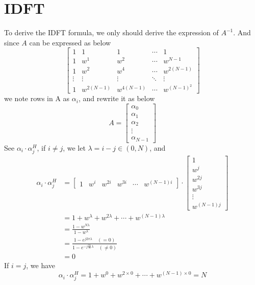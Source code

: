 \documentclass{article}
\begin{document}
\section{IDFT}
To derive the IDFT formula, we only should derive the expression of $A^{-1}$. And since $A$ can be expressed as below
$$
\begin{bmatrix}
 1 & 1 & 1 & \cdots & 1 \\
 1 & w^1 & w^2 & \cdots & w^{N - 1} \\
 1 & w^2 & w^4 & \cdots & w^{2(N - 1)}\\ 
 \vdots & \vdots & \vdots& \ddots & \vdots\\
 1 & w^{2(N - 1)} & w^{4(N - 1)} & \cdots & w^{(N - 1)^2}
 \end{bmatrix}
$$
we note rows in A as $\alpha_i$, and rewrite it as below
$$
A = 
\begin{bmatrix}
\alpha_0 \\ \alpha_1 \\ \alpha_2 \\ \vdots \\ \alpha_{N - 1}
 \end{bmatrix} 
$$
See $\alpha_i \cdot \alpha_j^H$, if $i \neq j$, we let $\lambda = i - j \in (0, N)$, and
\begin{equation}
\begin{aligned}
    \alpha_i \cdot \alpha_j^H &= \begin{bmatrix}
    1 & w^i & w^{2i} & w^{3i} & \cdots & w^{(N - 1)i}
     \end{bmatrix}
     \cdot
     \begin{bmatrix}
    1 \\ w^j \\ w^{2j} \\ w^{3j} \\ \vdots \\ w^{(N - 1)j}
     \end{bmatrix}\\
     &= 1 + w^{\lambda} + w^{2 \lambda} + \cdots + w^{(N - 1) \lambda}\\
     &= \frac{1 - w^{N \lambda}}{1 - w^{\lambda}}\\ 
     &= \frac{1 - e^{j 2\pi\lambda} \quad (= 0)}{1 - e^{-j\frac{2\pi}{N}\lambda} \quad (\neq 0)}\\ 
     &= 0
\end{aligned}
\label{eq:inj}
\end{equation}
If $i = j$, we have
\begin{equation}
    \alpha_i \cdot \alpha_j^H = 1 + w^{0} + w^{2 \times 0} + \cdots + w^{(N - 1) \times 0} = N
    \label{eq:ij}
\end{equation}
\end{document}
